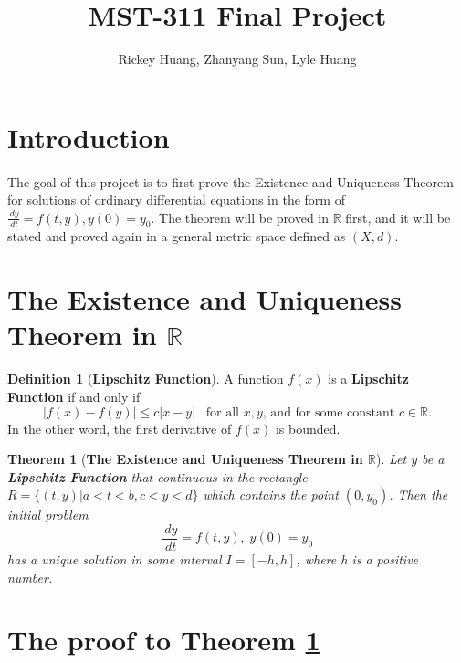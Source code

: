 \documentclass{article}
\title{MST-311 Final Project}
\author{Rickey Huang, Zhanyang Sun, Lyle Huang}
\newtheorem{theorem}{Theorem}[section]
\theoremstyle{definition}
\newtheorem{definition}{Definition}[section]
\theoremstyle{remark}
\begin{document}
\maketitle

\section{Introduction}

\paragraph{  }

The goal of this project is to first prove the Existence and Uniqueness Theorem for solutions of ordinary differential equations in the form of $\tfrac{\,dy}{\,dt} = f(t,y), y(0) = y_0$. The theorem will be proved in $\mathbb{R}$ first, and it will be stated and proved again in a general metric space defined as $(X,d)$.

\section{The Existence and Uniqueness Theorem in $\mathbb{R}$}

\begin{definition}[\textbf{Lipschitz Function}]\label{def:Lip}
    A function $f(x)$ is a \textbf{Lipschitz Function} if and only if 
    \begin{equation}\label{eqn:Lip}
        \lvert f(x) - f(y) \rvert \leq c \lvert x - y \rvert \;\;\; \text{for all $x, y$, and for some constant $c \in \mathbb{R}$}.
    \end{equation}
    In the other word, the first derivative of $f(x)$ is bounded.
\end{definition}
 
\begin{theorem}[\textbf{The Existence and Uniqueness Theorem in $\mathbb{R}$}]
\label{thm:EUT}
Let $y$ be a \textbf{Lipschitz Function} that continuous in the rectangle $R = \{(t,y)|a < t < b, c < y < d\}$ which contains the point $(0, y_0)$. Then the initial problem
    \begin{equation}\label{eqn:ode}
        \dfrac{\,dy}{\,dt} = f(t,y),\; y(0) = y_0
    \end{equation}
has a unique solution in some interval $I = [-h, h]$, where h is a positive number.
\end{theorem}

\section{The proof to Theorem \ref{thm:EUT}}
\end{document}
